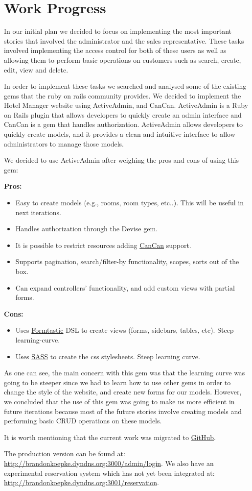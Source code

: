 \section{Work Progress}

In our initial plan we decided to focus on implementing the most important stories that   involved the administrator and the sales representative. These tasks involved implementing the access control for both of these users as well as allowing them to perform basic operations on customers such as search, create, edit, view and delete.

In order to implement these tasks we searched and analysed some of the existing gems that the ruby on rails community provides. We decided to implement the Hotel Manager website using ActiveAdmin, and CanCan. ActiveAdmin is a Ruby on Rails plugin that allows developers to quickly create an admin interface and CanCan is a gem that handles authorization.  ActiveAdmin allows developers to quickly create models, and it provides a clean and intuitive interface to allow administrators to manage those models.

We decided to use ActiveAdmin after weighing the pros and cons of using this gem:

\textbf{Pros:}
\begin{itemize}
	\item Easy to create models (e.g., rooms, room types, etc..). This will be useful in next iterations.
	\item Handles authorization through the Devise gem.
	\item It is possible to restrict resources adding \href{https://github.com/ryanb/cancan}{CanCan} support.
	\item Supports pagination, search/filter-by functionality, scopes, sorts out of the box.
	\item Can expand controllers' functionality, and add custom views with partial forms. 
\end{itemize}
\textbf{Cons:}
\begin{itemize}
	\item Uses \href{https://github.com/justinfrench/formtastic}{Formtastic} DSL to create views (forms, sidebars, tables, etc). Steep learning-curve.
	\item Uses \href{http://sass-lang.com}{SASS} to create the css stylesheets. Steep learning curve.
\end{itemize}
As one can see, the main concern with this gem was that the learning curve was going to be steeper since we had to learn how to use other gems in order to change the style of the website, and create new forms for our models. However, we concluded that the use of this gem was going to make us more efficient in future iterations because most of the future stories involve creating models and performing basic CRUD operations on these models.

It is worth mentioning that the current work was migrated to \href{https://github.com/bdkoepke/hotelmanager}{GitHub}.

The production version can be found at: \url{http://brandonkoepke.dyndns.org:3000/admin/login}. We also have an experimental reservation system which has not yet been integrated at: \url{http://brandonkoepke.dyndns.org:3001/reservation}.
